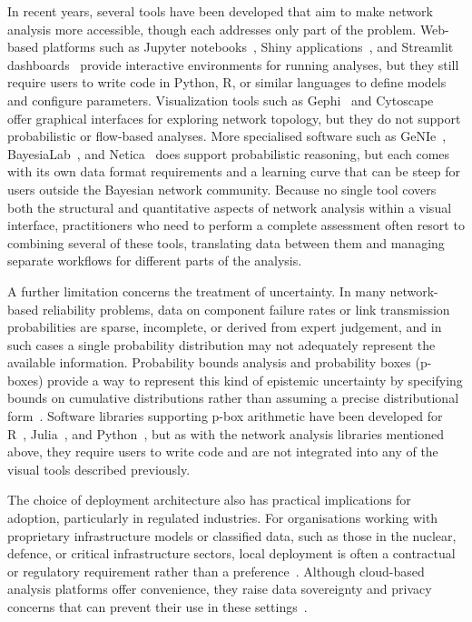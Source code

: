 \documentclass[conference]{IEEEtran}
\begin{document}
In recent years, several tools have been developed that aim to make network analysis more accessible, though each addresses only part of the problem. Web-based platforms such as Jupyter notebooks~\cite{kluyver2016jupyter}, Shiny applications~\cite{chang2015shiny}, and Streamlit dashboards~\cite{streamlit2019} provide interactive environments for running analyses, but they still require users to write code in Python, R, or similar languages to define models and configure parameters. Visualization tools such as Gephi~\cite{bastian2009gephi} and Cytoscape~\cite{shannon2003cytoscape} offer graphical interfaces for exploring network topology, but they do not support probabilistic or flow-based analyses. More specialised software such as GeNIe~\cite{druzdzel1999genie}, BayesiaLab~\cite{bayesialab}, and Netica~\cite{norsys1998netica} does support probabilistic reasoning, but each comes with its own data format requirements and a learning curve that can be steep for users outside the Bayesian network community. Because no single tool covers both the structural and quantitative aspects of network analysis within a visual interface, practitioners who need to perform a complete assessment often resort to combining several of these tools, translating data between them and managing separate workflows for different parts of the analysis.

A further limitation concerns the treatment of uncertainty. In many network-based reliability problems, data on component failure rates or link transmission probabilities are sparse, incomplete, or derived from expert judgement, and in such cases a single probability distribution may not adequately represent the available information. Probability bounds analysis and probability boxes (p-boxes) provide a way to represent this kind of epistemic uncertainty by specifying bounds on cumulative distributions rather than assuming a precise distributional form~\cite{ferson2003constructing}. Software libraries supporting p-box arithmetic have been developed for R~\cite{ferson2019pbar}, Julia~\cite{gray2022pba_julia}, and Python~\cite{gray2022pba}, but as with the network analysis libraries mentioned above, they require users to write code and are not integrated into any of the visual tools described previously.

The choice of deployment architecture also has practical implications for adoption, particularly in regulated industries. For organisations working with proprietary infrastructure models or classified data, such as those in the nuclear, defence, or critical infrastructure sectors, local deployment is often a contractual or regulatory requirement rather than a preference~\cite{kleppmann2019local}. Although cloud-based analysis platforms offer convenience, they raise data sovereignty and privacy concerns that can prevent their use in these settings~\cite{hashizume2013analysis}.
\end{document}
